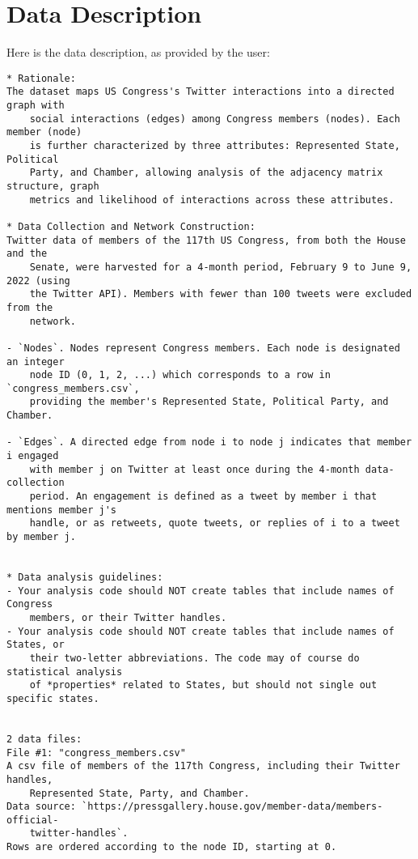 \documentclass[11pt]{article}
\begin{document}
\clearpage
\appendix

\section{Data Description} \label{sec:data_description} Here is the data description, as provided by the user:

\begin{Verbatim}[tabsize=4]
* Rationale:
The dataset maps US Congress's Twitter interactions into a directed graph with
	social interactions (edges) among Congress members (nodes). Each member (node)
	is further characterized by three attributes: Represented State, Political
	Party, and Chamber, allowing analysis of the adjacency matrix structure, graph
	metrics and likelihood of interactions across these attributes.

* Data Collection and Network Construction:
Twitter data of members of the 117th US Congress, from both the House and the
	Senate, were harvested for a 4-month period, February 9 to June 9, 2022 (using
	the Twitter API). Members with fewer than 100 tweets were excluded from the
	network.

- `Nodes`. Nodes represent Congress members. Each node is designated an integer
	node ID (0, 1, 2, ...) which corresponds to a row in `congress_members.csv`,
	providing the member's Represented State, Political Party, and Chamber.

- `Edges`. A directed edge from node i to node j indicates that member i engaged
	with member j on Twitter at least once during the 4-month data-collection
	period. An engagement is defined as a tweet by member i that mentions member j's
	handle, or as retweets, quote tweets, or replies of i to a tweet by member j.


* Data analysis guidelines:
- Your analysis code should NOT create tables that include names of Congress
	members, or their Twitter handles.
- Your analysis code should NOT create tables that include names of States, or
	their two-letter abbreviations. The code may of course do statistical analysis
	of *properties* related to States, but should not single out specific states.


2 data files:
File #1: "congress_members.csv"
A csv file of members of the 117th Congress, including their Twitter handles,
	Represented State, Party, and Chamber.
Data source: `https://pressgallery.house.gov/member-data/members-official-
	twitter-handles`.
Rows are ordered according to the node ID, starting at 0.


\end{Verbatim}
\end{document}
